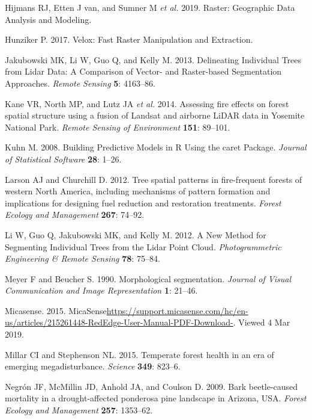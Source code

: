 \documentclass[]{article}
\begin{document}
\hypertarget{ref-hijmans2019}{}
Hijmans RJ, Etten J van, and Sumner M \emph{et al.} 2019. Raster:
Geographic Data Analysis and Modeling.

\hypertarget{ref-hunziker2017}{}
Hunziker P. 2017. Velox: Fast Raster Manipulation and Extraction.

\hypertarget{ref-jakubowski2013}{}
Jakubowski MK, Li W, Guo Q, and Kelly M. 2013. Delineating Individual
Trees from Lidar Data: A Comparison of Vector- and Raster-based
Segmentation Approaches. \emph{Remote Sensing} \textbf{5}: 4163--86.

\hypertarget{ref-kane2014}{}
Kane VR, North MP, and Lutz JA \emph{et al.} 2014. Assessing fire
effects on forest spatial structure using a fusion of Landsat and
airborne LiDAR data in Yosemite National Park. \emph{Remote Sensing of
Environment} \textbf{151}: 89--101.

\hypertarget{ref-kuhn2008}{}
Kuhn M. 2008. Building Predictive Models in R Using the caret Package.
\emph{Journal of Statistical Software} \textbf{28}: 1--26.

\hypertarget{ref-larson2012}{}
Larson AJ and Churchill D. 2012. Tree spatial patterns in fire-frequent
forests of western North America, including mechanisms of pattern
formation and implications for designing fuel reduction and restoration
treatments. \emph{Forest Ecology and Management} \textbf{267}: 74--92.

\hypertarget{ref-li2012}{}
Li W, Guo Q, Jakubowski MK, and Kelly M. 2012. A New Method for
Segmenting Individual Trees from the Lidar Point Cloud.
\emph{Photogrammetric Engineering \& Remote Sensing} \textbf{78}:
75--84.

\hypertarget{ref-meyer1990}{}
Meyer F and Beucher S. 1990. Morphological segmentation. \emph{Journal
of Visual Communication and Image Representation} \textbf{1}: 21--46.

\hypertarget{ref-micasense2015}{}
Micasense. 2015.
MicaSense\url{https://support.micasense.com/hc/en-us/articles/215261448-RedEdge-User-Manual-PDF-Download-}.
Viewed 4 Mar 2019.

\hypertarget{ref-millar2015}{}
Millar CI and Stephenson NL. 2015. Temperate forest health in an era of
emerging megadisturbance. \emph{Science} \textbf{349}: 823--6.

\hypertarget{ref-negron2009}{}
Negrón JF, McMillin JD, Anhold JA, and Coulson D. 2009. Bark
beetle-caused mortality in a drought-affected ponderosa pine landscape
in Arizona, USA. \emph{Forest Ecology and Management} \textbf{257}:
1353--62.
\end{document}
